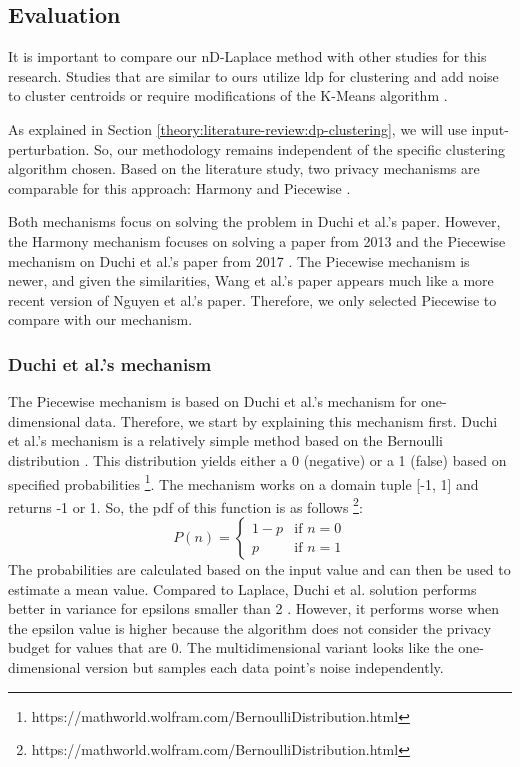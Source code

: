 \subsection{Evaluation}
It is important to compare our nD-Laplace method with other studies for this research.
Studies that are similar to ours utilize \gls{ldp} for clustering and add noise to cluster centroids \citep{xia_distributed_2020, yuan_privacypreserving_2021, 9679364} or require modifications of the K-Means algorithm \citep{sun_distributed_2019}.

As explained in Section \ref{theory:literature-review:dp-clustering}, we will use input-perturbation.
So, our methodology remains independent of the specific clustering algorithm chosen.
Based on the literature study, two privacy mechanisms are comparable for this approach: Harmony \citep{nguyen_collecting_2016} and Piecewise \citep{wang_collecting_2019}.

Both mechanisms focus on solving the problem in Duchi et al.'s paper.
However, the Harmony mechanism focuses on solving a paper from 2013 \citep{duchi_privacy_2013} and the Piecewise mechanism on Duchi et al.'s paper from 2017 \citep{duchi_minimax_2017}.
The Piecewise mechanism is newer, and given the similarities, Wang et al.'s paper appears much like a more recent version of Nguyen et al.'s paper.
Therefore, we only selected Piecewise to compare with our mechanism.

\subsubsection{Duchi et al.'s mechanism}
The Piecewise mechanism is based on Duchi et al.'s mechanism for one-dimensional data.
Therefore, we start by explaining this mechanism first.
Duchi et al.'s mechanism is a relatively simple method based on the Bernoulli distribution \citep{duchi_minimax_2017}.
This distribution yields either a 0 (negative) or a 1 (false) based on specified probabilities \footnote{https://mathworld.wolfram.com/BernoulliDistribution.html}.
The mechanism works on a domain tuple [-1, 1] and returns -1 or 1.
So, the \gls{pdf} of this function is as follows \footnote{https://mathworld.wolfram.com/BernoulliDistribution.html}:
\begin{equation}[H]
  P(n) =
  \begin{cases}
    1 - p & \text{if } n = 0 \\
    p     & \text{if } n = 1
  \end{cases}
\end{equation}
The probabilities are calculated based on the input value and can then be used to estimate a mean value.
Compared to Laplace, Duchi et al. solution performs better in variance for epsilons smaller than 2 \citep{wang_collecting_2019}.
However, it performs worse when the epsilon value is higher because the algorithm does not consider the privacy budget for values that are 0.
The multidimensional variant looks like the one-dimensional version but samples each data point's noise independently.

